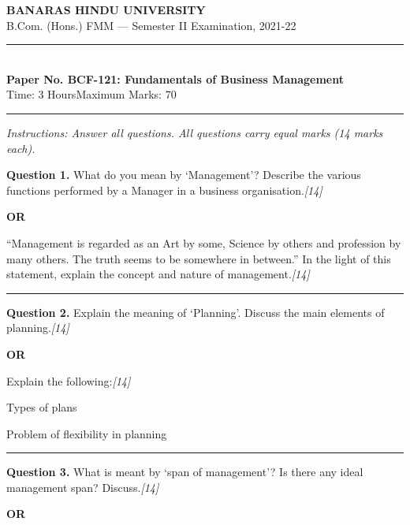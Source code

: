 \documentclass[11pt,a4paper]{article}
\newcommand{\pts}[1]{\hfill   \textit{[#1]}}
\begin{document}
\begin{center}
  {\large\bfseries BANARAS HINDU UNIVERSITY}\\[2pt]
  {\normalsize B.Com. (Hons.) FMM --- Semester II Examination, 2021-22}\\[6pt]
  \rule{0.8\linewidth}{0.5pt}\\[6pt]
  {\large\bfseries Paper No. BCF-121: Fundamentals of Business Management}\\[4pt]
  {\normalsize Time: 3 Hours\hfill Maximum Marks: 70}
\end{center}

\rule{\linewidth}{0.4pt}

\smallskip



\noindent   \textit{Instructions: Answer all questions. All questions carry equal marks (14 marks each).}

\bigskip




\noindent   \textbf{Question 1.}
What do you mean by `Management'? Describe the various functions performed by a Manager in a business organisation.\pts{14}

\centerline{   \textbf{OR}}

``Management is regarded as an Art by some, Science by others and profession by many others. The truth seems to be somewhere in between.'' In the light of this statement, explain the concept and nature of management.\pts{14}

\medskip\rule{\linewidth}{0.2pt}




\noindent   \textbf{Question 2.}
Explain the meaning of `Planning'. Discuss the main elements of planning.\pts{14}

\centerline{   \textbf{OR}}

Explain the following:\pts{14}

\begin{parts}
  \item Types of plans
  \item Problem of flexibility in planning
\end{parts}

\medskip\rule{\linewidth}{0.2pt}




\noindent   \textbf{Question 3.}
What is meant by `span of management'? Is there any ideal management span? Discuss.\pts{14}

\centerline{   \textbf{OR}}
\end{document}
